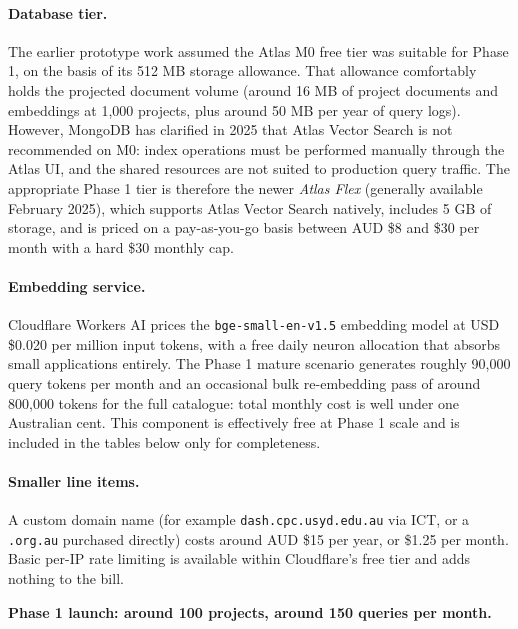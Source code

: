 \documentclass[11pt,a4paper]{article}
\begin{document}
\paragraph{Database tier.} The earlier prototype work assumed the Atlas M0 free tier was suitable for Phase 1, on the basis of its 512 MB storage allowance. That allowance comfortably holds the projected document volume (around 16 MB of project documents and embeddings at 1{,}000 projects, plus around 50 MB per year of query logs). However, MongoDB has clarified in 2025 that Atlas Vector Search is not recommended on M0: index operations must be performed manually through the Atlas UI, and the shared resources are not suited to production query traffic. The appropriate Phase 1 tier is therefore the newer \emph{Atlas Flex} (generally available February 2025), which supports Atlas Vector Search natively, includes 5 GB of storage, and is priced on a pay-as-you-go basis between AUD \$8 and \$30 per month with a hard \$30 monthly cap.

\paragraph{Embedding service.} Cloudflare Workers AI prices the \texttt{bge-small-en-v1.5} embedding model at USD \$0.020 per million input tokens, with a free daily neuron allocation that absorbs small applications entirely. The Phase 1 mature scenario generates roughly 90{,}000 query tokens per month and an occasional bulk re-embedding pass of around 800{,}000 tokens for the full catalogue: total monthly cost is well under one Australian cent. This component is effectively free at Phase 1 scale and is included in the tables below only for completeness.

\paragraph{Smaller line items.} A custom domain name (for example \texttt{dash.cpc.usyd.edu.au} via ICT, or a \texttt{.org.au} purchased directly) costs around AUD \$15 per year, or \$1.25 per month. Basic per-IP rate limiting is available within Cloudflare's free tier and adds nothing to the bill.

\medskip

\noindent\textbf{Phase 1 launch: around 100 projects, around 150 queries per month.}

\medskip
\end{document}
